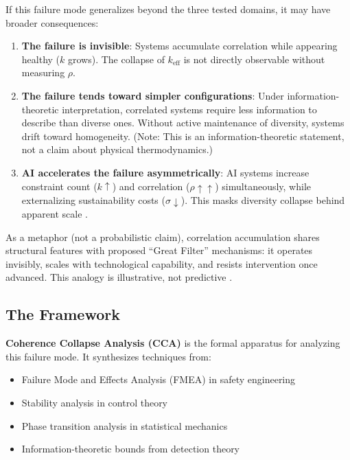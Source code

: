 \documentclass[11pt,a4paper]{article}
\theoremstyle{definition}
\theoremstyle{remark}
\newcommand{\keff}{k_{\text{eff}}}
\begin{document}
If this failure mode generalizes beyond the three tested domains, it may have broader consequences:

\begin{enumerate}[noitemsep]
    \item \textbf{The failure is invisible}: Systems accumulate correlation while appearing healthy ($k$ grows). The collapse of $\keff$ is not directly observable without measuring $\rho$.

    \item \textbf{The failure tends toward simpler configurations}: Under information-theoretic interpretation, correlated systems require less information to describe than diverse ones. Without active maintenance of diversity, systems drift toward homogeneity. (Note: This is an information-theoretic statement, not a claim about physical thermodynamics.)

    \item \textbf{AI accelerates the failure asymmetrically}: AI systems increase constraint count ($k \uparrow$) and correlation ($\rho \uparrow \uparrow$) simultaneously, while externalizing sustainability costs ($\sigma \downarrow$). This masks diversity collapse behind apparent scale \cite{glickman2024, homogenization2025, pnas_echoes2025}.
\end{enumerate}

As a metaphor (not a probabilistic claim), correlation accumulation shares structural features with proposed ``Great Filter'' mechanisms: it operates invisibly, scales with technological capability, and resists intervention once advanced. This analogy is illustrative, not predictive \cite{shumailov2024, cepr2025}.

\subsection{The Framework}

\textbf{Coherence Collapse Analysis (CCA)} is the formal apparatus for analyzing this failure mode. It synthesizes techniques from:
\begin{itemize}[noitemsep]
    \item Failure Mode and Effects Analysis (FMEA) in safety engineering
    \item Stability analysis in control theory
    \item Phase transition analysis in statistical mechanics
    \item Information-theoretic bounds from detection theory
\end{itemize}
\end{document}
